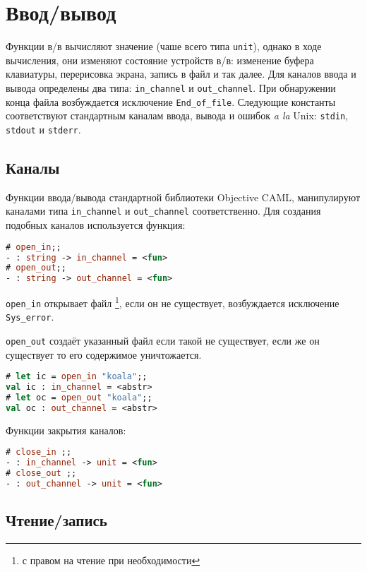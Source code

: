 \section{Ввод/вывод}
\label{sec:input-output}

Функции в/в вычисляют значение (чаше всего типа \texttt{unit}), однако в ходе
вычисления, они изменяют состояние устройств в/в: изменение буфера клавиатуры,
перерисовка экрана, запись в файл и так далее. Для каналов ввода и вывода
определены два типа: \texttt{in\_channel} и \texttt{out\_channel}. При
обнаружении конца файла возбуждается исключение \texttt{End\_of\_file}.
Следующие константы соответствуют стандартным каналам ввода, вывода и ошибок
{\it a la} Unix: \texttt{stdin}, \texttt{stdout} и \texttt{stderr}.

\subsection{Каналы}
\label{subsec:channels}

Функции ввода/вывода стандартной библиотеки Objective CAML, манипулируют
каналами типа \texttt{in\_channel} и \texttt{out\_channel} соответственно. Для
создания подобных каналов используется функция:

\begin{lstlisting}[language=OCaml]
# open_in;;
- : string -> in_channel = <fun>
# open_out;;
- : string -> out_channel = <fun>
\end{lstlisting}

\texttt{open\_in} открывает файл \footnote{с правом на чтение при
необходимости}, если он не существует, возбуждается исключение
\texttt{Sys\_error}.

\texttt{open\_out} создаёт указанный файл если такой не существует, если же он
существует то его содержимое уничтожается.

\begin{lstlisting}[language=OCaml]
# let ic = open_in "koala";;
val ic : in_channel = <abstr>
# let oc = open_out "koala";;
val oc : out_channel = <abstr>
\end{lstlisting}

Функции закрытия каналов:

\begin{lstlisting}[language=OCaml]
# close_in ;;
- : in_channel -> unit = <fun>
# close_out ;;
- : out_channel -> unit = <fun>
\end{lstlisting}

\subsection{Чтение/запись}
\label{subsec:reading_and_Writing}

